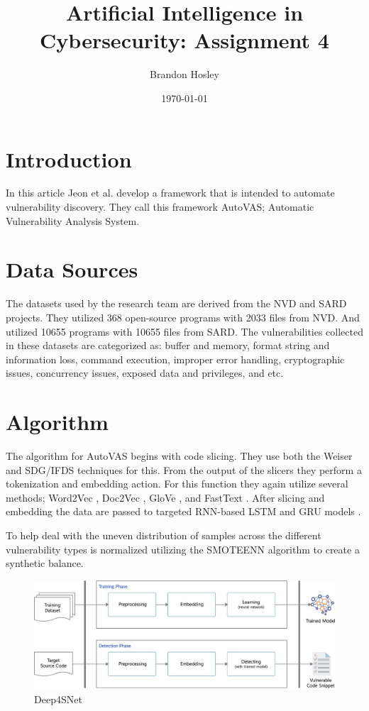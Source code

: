 \documentclass[]{article}
\title{Artificial Intelligence in Cybersecurity: Assignment 4}
\author{Brandon Hosley}
\date{\today}
\begin{document}
	\maketitle
	
\section{Introduction}

In this article \cite{Jeon2021} Jeon et al. develop a framework that is intended to automate vulnerability discovery.
They call this framework AutoVAS; Automatic Vulnerability Analysis System.


\section{Data Sources}

The datasets used by the research team are derived from the NVD and SARD projects.
They utilized 368 open-source programs with 2033 files from NVD.
And utilized 10655 programs with 10655 files from SARD.
The vulnerabilities collected in these datasets are categorized as:
buffer and memory,
format string and information loss,
command execution,
improper error handling,
cryptographic issues,
concurrency issues,
exposed data and privileges,
and etc.

\section{Algorithm}

The algorithm for AutoVAS begins with code slicing.
They use both the Weiser \cite{Weiser1984} and SDG/IFDS \cite{Naeem2010} techniques for this.
From the output of the slicers they perform a tokenization and embedding action.
For this function they again utilize several methods;
Word2Vec \cite{Mikolov2013},
Doc2Vec \cite{Le2014},
GloVe \cite{Pennington2014},
and FastText \cite{Mikolov2017}.
After slicing and embedding the data are passed to targeted RNN-based LSTM and GRU models \cite{Su2017}.

To help deal with the uneven distribution of samples across the different vulnerability types is normalized utilizing the 
SMOTEENN \cite{Li2013}
algorithm to create a synthetic balance.

\begin{figure}[h]
	\centering
	\includegraphics[width=\textwidth]{Algorithm}
	\caption{Deep4SNet \cite{Jeon2021}}
\end{figure}
\end{document}
